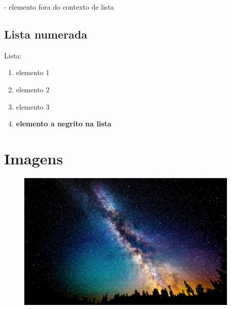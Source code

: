 \documentclass{article}
\begin{document}
	- elemento fora do contexto de lista

\subsection{ Lista numerada }

Lista:

\begin{enumerate}
 
	
	\item  elemento 1

	
	\item  elemento 2

	
	\item  elemento 3

	
	\item  
\textbf{ elemento a negrito na lista }
\end{enumerate}

\section{ Imagens }
	
\begin{figure}[h]
\includegraphics[width=400px]{ Image1.jpg }

\end{figure}
\end{document}
